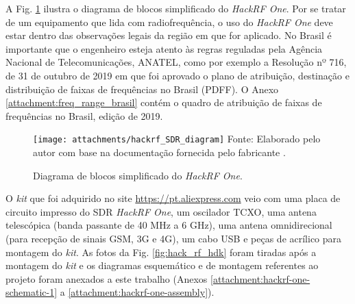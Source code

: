 \documentclass[
  12pt,				%
  openright,			%
  twoside,			%
  a4paper,			%
  english,			%
  french,				%
  spanish,			%
  brazil,				%
  ]{abntex2}
\begin{document}
A Fig. \ref{fig:hackrf_block_diagram} ilustra o diagrama de blocos simplificado do \textit{HackRF One}. Por se tratar de um equipamento que lida com radiofrequência, o uso do \textit{HackRF One} deve estar dentro das observações legais da região em que for aplicado. No Brasil é importante que o
engenheiro esteja atento às regras reguladas pela Agência Nacional de Telecomunicações, ANATEL, como por exemplo a Resolução nº 716, de 31 de outubro de 2019 em que foi aprovado o plano de
atribuição, destinação e distribuição de faixas de frequências no Brasil (PDFF). O Anexo \ref{attachment:freq_range_brasil} contém o quadro de atribuição de faixas de frequências no Brasil, edição de 2019.

\begin{figure}[!htb]
  \centering
  \caption{Diagrama de blocos simplificado do \textit{HackRF One}.}
  \texttt{[image: attachments/hackrf\_SDR\_diagram]}
  Fonte: Elaborado pelo autor com base na documentação fornecida pelo fabricante \cite{HACKRF-hardware-components}.
  \label{fig:hackrf_block_diagram}
\end{figure}

O \textit{kit} que foi adquirido no site \href{https://pt.aliexpress.com}{https://pt.aliexpress.com} veio com uma placa de circuito impresso do SDR \textit{HackRF One}, um oscilador TCXO,
uma antena telescópica (banda passante de 40 MHz a 6 GHz), uma antena omnidirecional (para recepção de sinais GSM, 3G e 4G), um cabo USB e peças de acrílico para montagem do \textit{kit}. As fotos da Fig.
\ref{fig:hack_rf_hdk} foram tiradas após a montagem do \textit{kit} e os diagramas esquemático e de montagem referentes ao projeto foram anexados a este trabalho (Anexos \ref{attachment:hackrf-one-schematic-1} a \ref{attachment:hackrf-one-assembly}).




\end{document}
